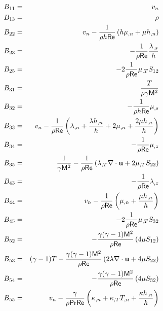 \pagebreak
{}
%
\begin{eqnarray} 
  B_{11} &=& \vn \\
  B_{13} &=& \rho \\
%
  B_{22} &=& \vn - \facth\left( h \mu_{,n} + \mu \hn \right) \\
  B_{23} &=& -\fact\frac{\lambda_{,s}}{h} \\
  B_{25} &=& -2\fact\dmu S_{12} \\
%
  B_{31} &=& \frac{ T}{\rho\gamma \M^2} \\
  B_{32} &=& -\facth \mu_{,s} \\
  B_{33} &=& \vn -\fact\left( \lambda_{,n} + \frac{\lambda \hn}{h} + 
             2 \mu_{,n} + \frac{2 \mu \hn}{h} \right) \\
  B_{34} &=& -\fact\mu_{,z} \\
  B_{35} &=& \frac{1}{\gamma \M^2} - 
             \fact\left(\dlm \divu + 2 \dmu S_{22} \right ) \\
%
  B_{43} &=& -\fact\lambda_{,z} \\
  B_{44} &=& \vn - \fact\left( \mu_{,n} + \frac{\mu \hn}{h} \right) \\
  B_{45} &=& -2 \fact\dmu S_{32} \\
%
  B_{52} &=& -\ff\left(4\mu S_{12}\right) \\
  B_{53} &=& \gammam T - \ff\left(2\lambda\divu + 4\mu S_{22}\right) \\
  B_{54} &=& -\ff\left(4\mu S_{32}\right) \\
  B_{55} &=& \vn - 
             \frac{\gamma}{\rho\Pr\Re}\left( \kappa_{,n} + 
             \dcon T_{,n} + \frac{\kappa \hn}{h} \right)
\end{eqnarray}

